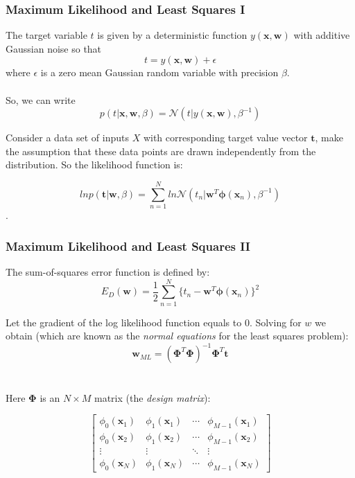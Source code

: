 \documentclass{beamer}
\begin{document}
\begin{frame}
\frametitle{Maximum Likelihood and Least Squares I}
The target variable $t$ is given by a deterministic function $y(\bm{x},\bm{w})$ with additive Gaussian noise so that
\begin{equation}
t = y(\bm{x},\bm{w})+ \epsilon
\end{equation} where $\epsilon$ is a zero mean Gaussian random variable with precision $\beta$. \\~\\

So, we can write
\begin{equation}
p(t|\bm{x},\bm{w},\beta) = \mathcal{N}(t|y(\bm{x},\bm{w}),\beta^{-1})
\end{equation}

Consider a data set of inputs $X$ with corresponding target value vector $\bm{t}$, make the assumption that these data points are drawn independently from the distribution. So the likelihood function is:

\begin{equation}
ln p(\bm{t}|\bm{w},\beta) = \sum_{n=1}^N ln \mathcal{N}(t_n|\bm{w}^T\bm{\phi}(\bm{x}_n),\beta^{-1})
\end{equation}.

\end{frame}

\begin{frame}
\frametitle{Maximum Likelihood and Least Squares II}
The sum-of-squares error function is defined by:
\begin{equation}
E_D(\bm{w}) = \frac{1}{2}\sum_{n=1}^{N}\{t_n-\bm{w}^T\bm{\phi}(\bm{x}_n)\}^2
\end{equation}

Let the gradient of the log likelihood function equals to $0$. Solving for $w$ we obtain (which are known as the \textit{normal equations} for the least squares problem):
\begin{equation}
\bm{w}_{ML} = (\bm{\Phi}^T\bm{\Phi})^{-1}\bm{\Phi}^T\bm{t}
\end{equation}\\~\\

Here $\bm{\Phi}$ is an $N \times M$ matrix (the \textit{design matrix}):

\[
\begin{bmatrix}
    \phi_0(\bm{x}_1) & \phi_1(\bm{x}_1) & \cdots& \phi_{M-1}(\bm{x}_1) \\
    \phi_0(\bm{x}_2) & \phi_1(\bm{x}_2) & \cdots & \phi_{M-1}(\bm{x}_2) \\
    \vdots & \vdots  & \ddots & \vdots \\
    \phi_0(\bm{x}_N) & \phi_1(\bm{x}_N) &\cdots & \phi_{M-1}(\bm{x}_N)
\end{bmatrix}
\]


\end{frame}
\end{document}

